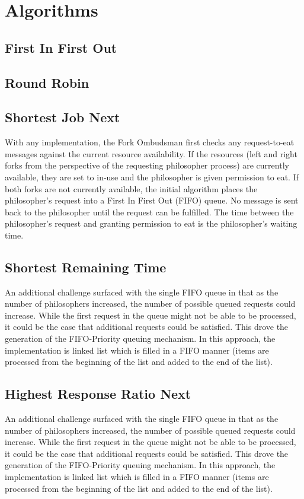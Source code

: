\documentclass[conference,11pt]{IEEEtran}
\begin{document}
\section{Algorithms}


\subsection{First In First Out}


\subsection{Round Robin}


\subsection{Shortest Job Next}
With any implementation, the Fork Ombudsman first checks any request-to-eat messages against the current resource availability. If the resources (left and right forks from the perspective of the requesting philosopher process) are currently available, they are set to in-use and the philosopher is given permission to eat. If both forks are not currently available, the initial algorithm places the philosopher's request into a First In First Out (FIFO) queue. No message is sent back to the philosopher until the request can be fulfilled. The time between the philosopher's request and granting permission to eat is the philosopher's waiting time.

\subsection{Shortest Remaining Time}
An additional challenge surfaced with the single FIFO queue in that as the number of philosophers increased, the number of possible queued requests could increase. While the first request in the queue might not be able to be processed, it could be the case that additional requests could be satisfied. This drove the generation of the FIFO-Priority queuing mechanism. In this approach, the implementation is linked list which is filled in a FIFO manner (items are processed from the beginning of the list and added to the end of the list).

\subsection{Highest Response Ratio Next}
An additional challenge surfaced with the single FIFO queue in that as the number of philosophers increased, the number of possible queued requests could increase. While the first request in the queue might not be able to be processed, it could be the case that additional requests could be satisfied. This drove the generation of the FIFO-Priority queuing mechanism. In this approach, the implementation is linked list which is filled in a FIFO manner (items are processed from the beginning of the list and added to the end of the list).
\end{document}
